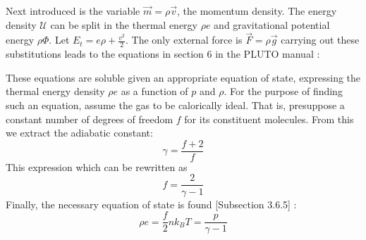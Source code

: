 {\centering 
\noindent {}
\par}

Next introduced is the variable $\vec{m}=\rho \vec{v}$, the momentum density. The energy density $\mathcal{U}$ can be split in the thermal energy $\rho e$ and gravitational potential energy $\rho\Phi$. Let $E_t = e\rho + \frac{v^2}{2}$. The only external force is $\vec{F} = \rho\vec{g}$
carrying out these substitutions leads to the equations in section 6 in the PLUTO manual \cite{pluto-manual}:

{\centering 
\noindent {}
\par}

These equations are soluble given an appropriate equation of state, expressing the thermal energy density $\rho e$ as a function of $p$ and $\rho$. For the purpose of finding such an equation, assume the gas to be calorically ideal. That is, presuppose a constant number of degrees of freedom $f$ for its constituent molecules. From this we extract the adiabatic constant:
\begin{equation}
	\gamma = \frac{f+2}{f}
	\label{eq:adiabatic constant}
\end{equation}
This expression which can be rewritten as
\begin{equation*}
	f = \frac{2}{\gamma-1}
\end{equation*}
Finally, the necessary equation of state is found \cite{notes-fluid-dynamics}[Subsection 3.6.5] :
\begin{equation*}
	\rho e = \frac{f}{2}nk_BT = \frac{p}{\gamma-1}
\end{equation*}


